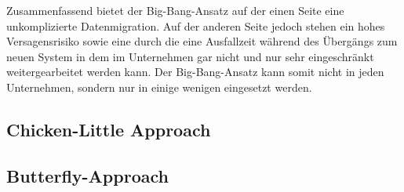 \lb
Zusammenfassend bietet der Big-Bang-Ansatz auf der einen Seite eine unkomplizierte Datenmigration. Auf der anderen Seite jedoch stehen ein hohes Versagensrisiko sowie eine durch die eine Ausfallzeit während des Übergängs zum neuen System in dem im Unternehmen gar nicht und nur sehr eingeschränkt weitergearbeitet werden kann. Der Big-Bang-Ansatz kann somit nicht in jeden Unternehmen, sondern nur in einige wenigen eingesetzt werden. 

\subsection{Chicken-Little Approach}


\subsection{Butterfly-Approach}


